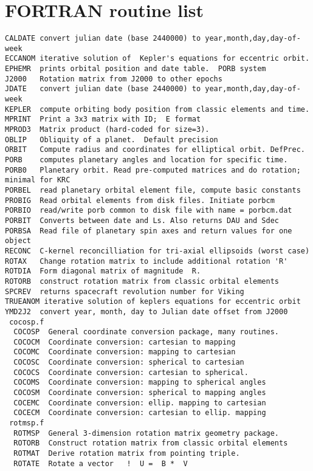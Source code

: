 \documentclass[draft]{article}
\begin{document}
 \section{FORTRAN routine list}
\vspace{-3.mm} 
\begin{verbatim}
CALDATE convert julian date (base 2440000) to year,month,day,day-of-week
ECCANOM iterative solution of  Kepler's equations for eccentric orbit.
EPHEMR  prints orbital position and date table.  PORB system
J2000   Rotation matrix from J2000 to other epochs
JDATE   convert julian date (base 2440000) to year,month,day,day-of-week
KEPLER  compute orbiting body position from classic elements and time.
MPRINT  Print a 3x3 matrix with ID;  E format
MPROD3  Matrix product (hard-coded for size=3).
OBLIP   Obliquity of a planet.  Default precision
ORBIT   Compute radius and coordinates for elliptical orbit. DefPrec.
PORB    computes planetary angles and location for specific time.
PORB0   Planetary orbit. Read pre-computed matrices and do rotation; minimal for KRC
PORBEL  read planetary orbital element file, compute basic constants 
PROBIG  Read orbital elements from disk files. Initiate porbcm
PORBIO  read/write porb common to disk file with name = porbcm.dat 
PORBIT  Converts between date and Ls. Also returns DAU and Sdec
PORBSA  Read file of planetary spin axes and return values for one object
RECONC 	C-kernel reconcilliation for tri-axial ellipsoids (worst case)
ROTAX   Change rotation matrix to include additional rotation 'R'
ROTDIA  Form diagonal matrix of magnitude  R.
ROTORB  construct rotation matrix from classic orbital elements
SPCREV  returns spacecraft revolution number for Viking
TRUEANOM iterative solution of keplers equations for eccentric orbit
YMD2J2  convert year, month, day to Julian date offset from J2000
 cocosp.f
  COCOSP  General coordinate conversion package, many routines.
  COCOCM  Coordinate conversion: cartesian to mapping
  COCOMC  Coordinate conversion: mapping to cartesian
  COCOSC  Coordinate conversion: spherical to cartesian
  COCOCS  Coordinate conversion: cartesian to spherical.
  COCOMS  Coordinate conversion: mapping to spherical angles
  COCOSM  Coordinate conversion: spherical to mapping angles
  COCEMC  Coordinate conversion: ellip. mapping to cartesian
  COCECM  Coordinate conversion: cartesian to ellip. mapping
 rotmsp.f
  ROTMSP  General 3-dimension rotation matrix geometry package.
  ROTORB  Construct rotation matrix from classic orbital elements 
  ROTMAT  Derive rotation matrix from pointing triple.
  ROTATE  Rotate a vector 	!  U =  B *  V

\end{verbatim}
\end{document}
